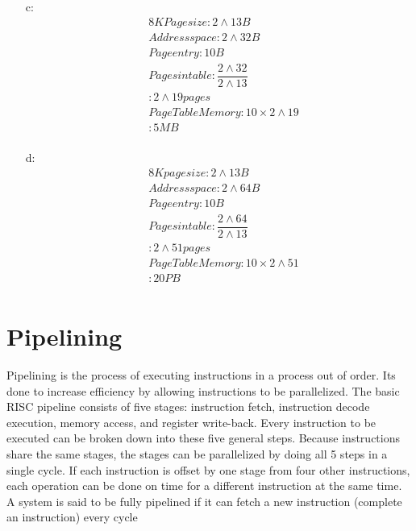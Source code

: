 \documentclass[letterpaper,10pt,titlepage]{article}
\begin{document}
\begin{itemize}
        \item[c:] 
            \begin{equation}
                \begin{aligned}
                    & 8K Page size      : 2\wedge13B \\
                    & Address space     : 2\wedge32B \\
                    & Page entry        : 10B  \\
                    & Pages in table    : \dfrac{2\wedge32}{2\wedge13} \\
                    &                   : 2\wedge19 pages \\
                    & Page Table Memory : 10\times2\wedge19 \\
                    &                   : 5MB \\
                \end{aligned}
            \end{equation}
        
        \item[d:] 
            \begin{equation}
                \begin{aligned}
                    & 8K page size      : 2\wedge13B \\
                    & Address space     : 2\wedge64B \\
                    & Page entry        : 10B  \\
                    & Pages in table    : \dfrac{2\wedge64}{2\wedge13} \\
                    &                   : 2\wedge51 pages \\
                    & Page Table Memory : 10\times2\wedge51 \\
                    &                   : 20PB \\
                \end{aligned}
            \end{equation}
    \end{itemize}
\pagebreak

\section{Pipelining}
    
    Pipelining is the process of executing instructions in a process out of order. 
    Its done to increase efficiency by allowing instructions to be parallelized. 
    The basic RISC pipeline consists of five stages: instruction fetch, instruction decode
    execution, memory access, and register write-back. Every instruction to be executed can 
    be broken down into these five general steps. Because instructions share the same stages, 
    the stages can be parallelized by doing all 5 steps in a single cycle. If each instruction is offset
    by one stage from four other instructions, each operation can be done on time for a different instruction
    at the same time. A system is said to be fully pipelined if it can fetch a new instruction (complete an instruction)
    every cycle\\
    
\end{document}
